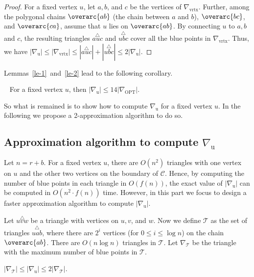 \documentclass[a4paper,UKenglish]{lipics-v2018}
\theoremstyle{definition}
\begin{document}
\begin{proof}
For a fixed vertex $u$, let $a, b$, and $c$ be the vertices of $\nabla_\mathrm{vrtx}$. Further, among the polygonal chains $\overarc{ab}$ (the chain between $a$ and $b$), $\overarc{bc}$, and $\overarc{ca}$, assume that $u$ lies on $\overarc{ab}$. By connecting $u$ to $a, b$ and $c$, the resulting triangles $\overset{\triangle}{a u c}$ and $\overset{\triangle}{u b c}$ cover all the blue points in $\nabla_\mathrm{vrtx}$. Thus, we have
$|\nabla_\mathrm{u}|   \leq  |\nabla_\mathrm{vrtx}| \leq |\overset{\triangle}{a u c}| + |\overset{\triangle}{u b c}| \leq 2 |\nabla_\mathrm{u}|$.
\end{proof}

Lemmas~\ref{le-1}~and~\ref{le-2} lead to the following corollary.

\begin{corollary}~\label{coro-main}
For a fixed vertex $u$, then $|\nabla_\mathrm{u}| \leq 14 |\nabla_{\mathrm{OPT}}|$.
\end{corollary}

So what is remained is to show how to compute $\nabla_\mathrm{u}$ for a fixed vertex $u$. In the following we propose a 2-approximation algorithm to do so.


\subsection{Approximation algorithm to compute $\nabla_\mathrm{u}$}
Let $n=r+b$.
For a fixed vertex $u$, there are $O(n^2)$ triangles with one vertex on $u$ and the other two vertices on the boundary of $\mathcal C$. Hence, by computing the number of blue points in each triangle in $O(f(n))$, the exact value of $|\nabla_\mathrm{u}|$ can be computed in $O(n^2\cdot f(n))$ time. However, in this part we focus to design a faster approximation algorithm to compute $|\nabla_\mathrm{u}|$.

Let $\overset{\triangle}{u v w}$ be a triangle with vertices on $u, v$, and $w$. Now we define $\mathcal T$ as the set of triangles $\overset{\triangle}{u a b}$, where there are $2^i$ vertices (for $0 \leq i \leq \log n$) on the chain $\overarc{ab}$. There are $O(n\log n)$ triangles in $\mathcal T$. Let $\nabla_{\mathcal T}$ be the triangle with the maximum number of blue points in $\mathcal T$.

\begin{lemma}
$|\nabla_{\mathcal T}| \leq |\nabla_\mathrm{u}| \leq 2|\nabla_{\mathcal T}|$.
\end{lemma}
\end{document}
